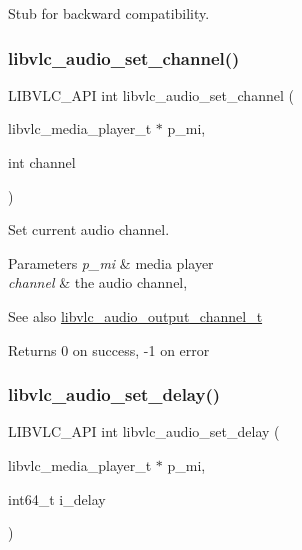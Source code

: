Stub for backward compatibility. \mbox{\label{group__libvlc__audio_ga9a3227c877b304588b3bd0e1c093b737}} 
\subsubsection{\texorpdfstring{libvlc\+\_\+audio\+\_\+set\+\_\+channel()}{libvlc\_audio\_set\_channel()}}
{\footnotesize\ttfamily L\+I\+B\+V\+L\+C\+\_\+\+A\+PI int libvlc\+\_\+audio\+\_\+set\+\_\+channel (\begin{DoxyParamCaption}\item[{libvlc\+\_\+media\+\_\+player\+\_\+t $\ast$}]{p\+\_\+mi,  }\item[{int}]{channel }\end{DoxyParamCaption})}

Set current audio channel.


\begin{DoxyParams}{Parameters}
{\em p\+\_\+mi} & media player \\
\hline
{\em channel} & the audio channel, \\
\hline
\end{DoxyParams}
\begin{DoxySeeAlso}{See also}
\hyperlink{group__libvlc__audio_ga50e752d67eaa2738e0f914805b1b3a05}{libvlc\+\_\+audio\+\_\+output\+\_\+channel\+\_\+t} 
\end{DoxySeeAlso}
\begin{DoxyReturn}{Returns}
0 on success, -\/1 on error 
\end{DoxyReturn}
\mbox{\label{group__libvlc__audio_ga8e2d21265f597723e978d325cab285b5}} 
\subsubsection{\texorpdfstring{libvlc\+\_\+audio\+\_\+set\+\_\+delay()}{libvlc\_audio\_set\_delay()}}
{\footnotesize\ttfamily L\+I\+B\+V\+L\+C\+\_\+\+A\+PI int libvlc\+\_\+audio\+\_\+set\+\_\+delay (\begin{DoxyParamCaption}\item[{libvlc\+\_\+media\+\_\+player\+\_\+t $\ast$}]{p\+\_\+mi,  }\item[{int64\+\_\+t}]{i\+\_\+delay }\end{DoxyParamCaption})}


